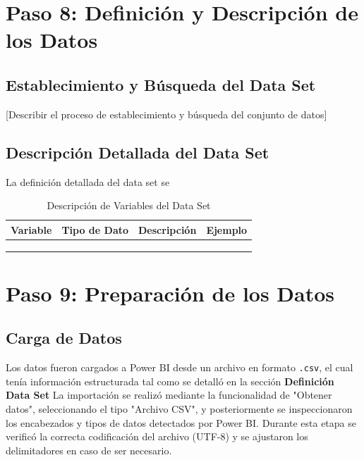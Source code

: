 \documentclass[12pt,letterpaper]{report}
\begin{document}
\section{Paso 8: Definición y Descripción de los Datos}

\subsection{Establecimiento y Búsqueda del Data Set}
[Describir el proceso de establecimiento y búsqueda del conjunto de datos]

\subsection{Descripción Detallada del Data Set}
La definición detallada del data set se 

\begin{table}[H]
    \centering
    \begin{tabularx}{\textwidth}{|X|X|X|X|}
        \hline
        \textbf{Variable} & \textbf{Tipo de Dato} & \textbf{Descripción} & \textbf{Ejemplo} \\
        \hline
        & & & \\
        \hline
        & & & \\
        \hline
        & & & \\
        \hline
    \end{tabularx}
    \caption{Descripción de Variables del Data Set}
\end{table}

\section{Paso 9: Preparación de los Datos}

\subsection{Carga de Datos}
Los datos fueron cargados a Power BI desde un archivo en formato \texttt{.csv}, el cual tenía información estructurada tal como se detalló en la sección \textbf{Definición Data Set} La importación se realizó mediante la funcionalidad de "Obtener datos", seleccionando el tipo "Archivo CSV", y posteriormente se inspeccionaron los encabezados y tipos de datos detectados por Power BI. Durante esta etapa se verificó la correcta codificación del archivo (UTF-8) y se ajustaron los delimitadores en caso de ser necesario.
\end{document}
